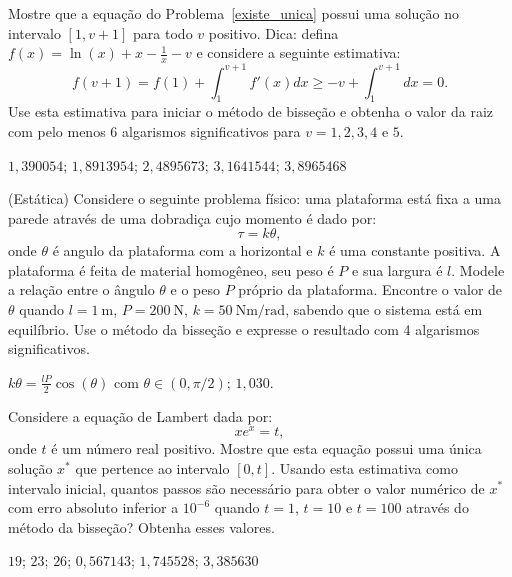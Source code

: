 \begin{exer} Mostre que a equação do Problema~\ref{existe_unica} possui uma solução no intervalo $[1, v+1]$ para todo $v$ positivo. Dica: defina $f(x)=\ln(x)+x-\frac{1}{x}-v$  e considere a seguinte estimativa:
  \begin{equation}
    f(v+1)=f(1)+\int_1^{v+1}f'(x)dx\geq -v+\int_1^{v+1}dx=0.
  \end{equation}
Use esta estimativa para iniciar o método de bisseção e obtenha o valor da raiz com pelo menos 6 algarismos significativos para $v=1, 2, 3, 4$ e $5$.
\end{exer}
\begin{resp}
    $1,390054$; $1,8913954$; $2,4895673$; $3,1641544$; $3,8965468$
\end{resp}

\begin{exer}(Estática) Considere o seguinte problema físico: uma plataforma está fixa a uma parede através de uma dobradiça cujo momento é dado por:
  \begin{equation}
    \tau=k\theta,
  \end{equation}
onde $\theta$ é angulo da plataforma com a horizontal e $k$ é uma constante positiva. A plataforma é feita de material homogêneo, seu peso é $P$ e sua largura é $l$. Modele a relação entre o ângulo $\theta$ e o peso $P$ próprio da plataforma. Encontre o valor de $\theta$ quando $l=1~\mbox{m}$, $P=200~\mbox{N}$, $k=50~\mbox{Nm}/\mbox{rad}$, sabendo que o sistema está em equilíbrio. Use o método da bisseção e expresse o resultado com 4 algarismos significativos.
\end{exer}
\begin{resp}
    $k\theta=\frac{lP}{2}\cos(\theta)$ com $\theta\in (0, \pi/2)$; $1,030$.
\end{resp}


\begin{exer} Considere a equação de Lambert dada por:
  \begin{equation}
    xe^x= t,
  \end{equation}
onde $t$ é um número real positivo. Mostre que esta equação possui uma única solução $x^*$ que pertence ao intervalo $[0, t]$. Usando esta estimativa como intervalo inicial, quantos passos são necessário para obter o valor numérico de $x^*$ com erro absoluto inferior a $10^{-6}$ quando $t=1$, $t=10$ e $t=100$ através do método da bisseção? Obtenha esses valores.
\end{exer}
\begin{resp}
    $19$; $23$; $26$; $0,567143$; $1,745528$; $3,385630$
\end{resp}

